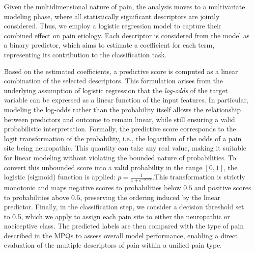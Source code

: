 \documentclass[preprint,12pt,authoryear]{elsarticle}
\begin{document}
Given the multidimensional nature of pain, the analysis moves to a multivariate modeling phase, where all statistically significant descriptors are jointly considered. Thus, we employ a logistic regression model to capture their combined effect on pain etiology. Each descriptor is considered from the model as a binary predictor, which aims to estimate a coefficient for each term, representing its contribution to the classification task.

Based on the estimated coefficients, a predictive score is computed as a linear combination of the selected descriptors. This formulation arises from the underlying assumption of logistic regression that the \emph{log-odds} of the target variable can be expressed as a linear function of the input features. In particular, modeling the log-odds rather than the probability itself allows the relationship between predictors and outcome to remain linear, while still ensuring a valid probabilistic interpretation. Formally, the predictive score corresponds to the logit transformation of the probability, i.e., the logarithm of the odds of a pain site being neuropathic. This quantity can take any real value, making it suitable for linear modeling without violating the bounded nature of probabilities. To convert this unbounded score into a valid probability in the range $[0,1]$, the logistic (sigmoid) function is applied: $p = \frac{1}{1 + e^{-\text{score}}}$.This transformation is strictly monotonic and maps negative scores to probabilities below $0.5$ and positive scores to probabilities above $0.5$, preserving the ordering induced by the linear predictor. %
Finally, in the classification step, we consider a decision threshold set to 0.5, which we apply to assign each pain site to either the neuropathic or nociceptive class. The predicted labels are then compared with the type of pain described in the MPQs to assess overall model performance, enabling a direct evaluation of the multiple descriptors of pain within a unified pain type.




\end{document}
